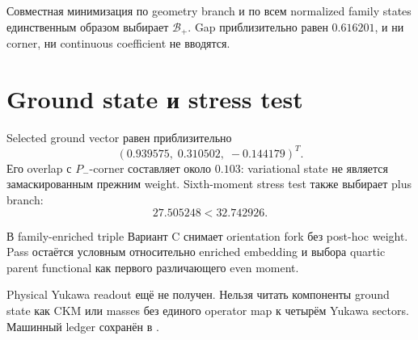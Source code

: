 \begin{theorem}
Совместная минимизация по geometry branch и по всем normalized family states
единственным образом выбирает \(\mathcal B_+\). Gap приблизительно равен
\(0.616201\), и ни corner, ни continuous coefficient не вводятся.
\end{theorem}

\section{Ground state и stress test}

Selected ground vector равен приблизительно
\begin{equation}
 (0.939575,\;0.310502,\;-0.144179)^T.
\end{equation}
Его overlap с \(P_-\)-corner составляет около \(0.103\): variational state
не является замаскированным прежним weight. Sixth-moment stress test также
выбирает plus branch:
\begin{equation}
 27.505248<32.742926.
\end{equation}

\begin{proposition}
В family-enriched triple Вариант C снимает orientation fork без post-hoc
weight. Pass остаётся условным относительно enriched embedding и выбора
quartic parent functional как первого различающего even moment.
\end{proposition}

Physical Yukawa readout ещё не получен. Нельзя читать компоненты ground state
как CKM или masses без единого operator map к четырём Yukawa sectors.
Машинный ledger сохранён в
.